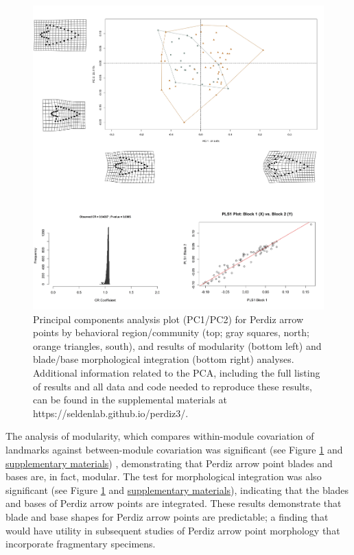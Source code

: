 \documentclass[smallextended]{svjour3}       %
\begin{document}
\begin{figure}
\includegraphics[width=1\linewidth]{ms-figs/figure4} \caption{Principal components analysis plot (PC1/PC2) for Perdiz arrow points by behavioral region/community (top; gray squares, north; orange triangles, south), and results of modularity (bottom left) and blade/base morphological integration (bottom right) analyses. Additional information related to the PCA, including the full listing of results and all data and code needed to reproduce these results, can be found in the supplemental materials at https://seldenlab.github.io/perdiz3/.}\label{fig:fig4}
\end{figure}

The analysis of modularity, which compares within-module covariation of
landmarks against between-module covariation was significant (see Figure
\ref{fig:fig4} and
\href{https://seldenlab.github.io/perdiz3/}{supplementary materials})
\cite{RN10874,RN5170}, demonstrating that Perdiz arrow point blades and
bases are, in fact, modular. The test for morphological integration was
also significant (see Figure \ref{fig:fig4} and
\href{https://seldenlab.github.io/perdiz3/}{supplementary materials}),
indicating that the blades and bases of Perdiz arrow points are
integrated. These results demonstrate that blade and base shapes for
Perdiz arrow points are predictable; a finding that would have utility
in subsequent studies of Perdiz arrow point morphology that incorporate
fragmentary specimens.
\end{document}
